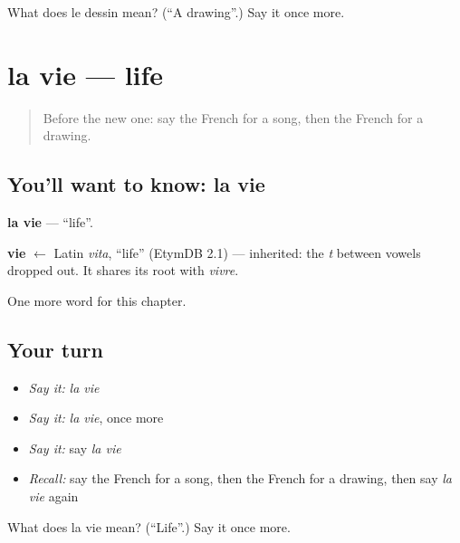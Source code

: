 \begin{tcolorbox}[breakable,colback=teal!4,colframe=teal!35!black,title={Before you move on}]
What does le dessin mean? (\textquotedblleft{}A drawing\textquotedblright{}.) Say it once more.
\end{tcolorbox}
\section[la vie]{la vie — life}

\label{lesson:FR-C129-vie}



\begin{quote}
Before the new one: say the French for a song, then the French for a drawing.
\end{quote}

\subsection*{You'll want to know: la vie}
\textbf{la vie} — \textquotedblleft{}life\textquotedblright{}.

\begin{cousinweb}
\textbf{vie} $\leftarrow$ Latin \emph{vita}, \textquotedblleft{}life\textquotedblright{} (EtymDB 2.1) — inherited: the \emph{t} between vowels dropped out. It shares its root with \emph{vivre}.
\end{cousinweb}

\begin{grammarlens}[title={What you've built}]
One more word for this chapter.
\end{grammarlens}

\subsection*{Your turn}
\begin{itemize}
\raggedright
  \item \emph{Say it:} \emph{la vie}
  \item \emph{Say it:} \emph{la vie}, once more
  \item \emph{Say it:} say \emph{la vie}
  \item \emph{Recall:} say the French for a song, then the French for a drawing, then say \emph{la vie} again
\end{itemize}

\begin{tcolorbox}[breakable,colback=teal!4,colframe=teal!35!black,title={Before you move on}]
What does la vie mean? (\textquotedblleft{}Life\textquotedblright{}.) Say it once more.
\end{tcolorbox}
